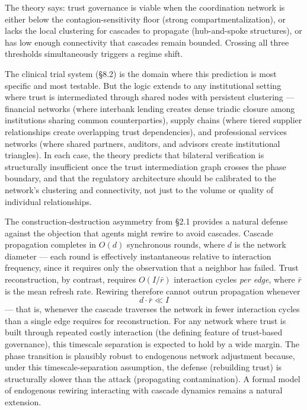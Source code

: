 \documentclass[11pt,a4paper]{article}
\begin{document}
The theory says: trust governance is viable when the coordination network is either below the contagion-sensitivity floor (strong compartmentalization), or lacks the local clustering for cascades to propagate (hub-and-spoke structures), or has low enough connectivity that cascades remain bounded. Crossing all three thresholds simultaneously triggers a regime shift.

The clinical trial system (\S8.2) is the domain where this prediction is most specific and most testable. But the logic extends to any institutional setting where trust is intermediated through shared nodes with persistent clustering --- financial networks (where interbank lending creates dense triadic closure among institutions sharing common counterparties), supply chains (where tiered supplier relationships create overlapping trust dependencies), and professional services networks (where shared partners, auditors, and advisors create institutional triangles). In each case, the theory predicts that bilateral verification is structurally insufficient once the trust intermediation graph crosses the phase boundary, and that the regulatory architecture should be calibrated to the network's clustering and connectivity, not just to the volume or quality of individual relationships.

The construction-destruction asymmetry from \S2.1 provides a natural defense against the objection that agents might rewire to avoid cascades. Cascade propagation completes in $O(d)$ synchronous rounds, where $d$ is the network diameter --- each round is effectively instantaneous relative to interaction frequency, since it requires only the observation that a neighbor has failed. Trust reconstruction, by contrast, requires $O(I/\bar{r})$ interaction cycles \emph{per edge}, where $\bar{r}$ is the mean refresh rate. Rewiring therefore cannot outrun propagation whenever
\begin{equation}
d \cdot \bar{r} \ll I
\label{eq:rewiring}
\end{equation}
--- that is, whenever the cascade traverses the network in fewer interaction cycles than a single edge requires for reconstruction. For any network where trust is built through repeated costly interaction (the defining feature of trust-based governance), this timescale separation is expected to hold by a wide margin. The phase transition is plausibly robust to endogenous network adjustment because, under this timescale-separation assumption, the defense (rebuilding trust) is structurally slower than the attack (propagating contamination). A formal model of endogenous rewiring interacting with cascade dynamics remains a natural extension.
\end{document}
